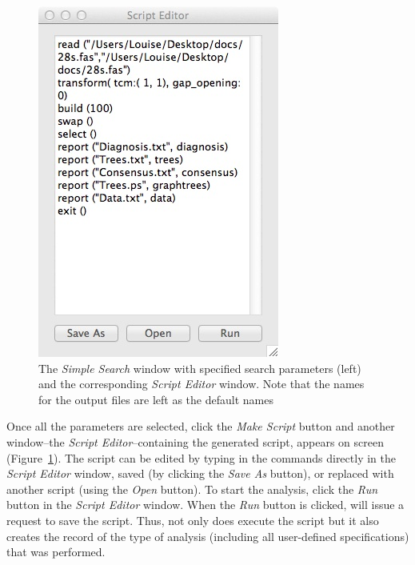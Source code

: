 \begin{figure}
\begin{minipage}[c]{0.52\textwidth}
	   	\includegraphics[width=\textwidth]{doc/figures/simplesearch_script.jpg}
   	\end{minipage}
	
    \caption{The \emph{Simple Search} window with specified search parameters (left) and the corresponding \emph{Script Editor} window. Note that the names for the output files are left as the default names}
    \label{fig:ScriptEditor_Window}
\end{figure}

Once all the parameters are selected, click the \emph{Make Script} button and another
window--the \emph{Script Editor}--containing the generated script, appears on screen (Figure~\ref{fig:ScriptEditor_Window}). 
The script can be edited by typing in the commands directly in the \emph{Script Editor} window,
 saved (by clicking the \emph{Save As} button), or replaced with another script (using 
 the \emph{Open} button). To start the analysis, click the \emph{Run} button in the 
 \emph{Script Editor} window. When the \emph{Run} button is clicked, \poy will issue a
 request to save the script. Thus, not only does \poy execute the script but
 it also creates the record of the type of analysis (including all user-defined specifications) that was performed.
 
